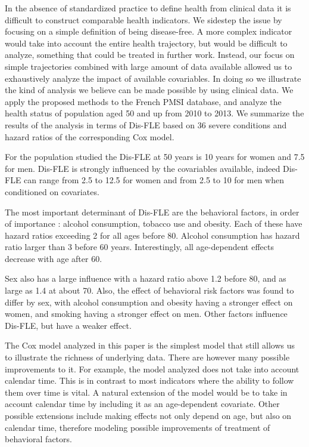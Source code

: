 \documentclass[risks,article,submit,moreauthors,pdftex]{Definitions/mdpi}
\begin{document}
In the absence of standardized practice to define health from clinical
data it is difficult to construct comparable health indicators. We
sidestep the issue by focusing on a simple definition of being
disease-free. A more complex indicator would take into account the
entire health trajectory, but would be difficult to analyze, something
that could be treated in further work. Instead, our focus on simple
trajectories combined with large amount of data available allowed us to
exhaustively analyze the impact of available covariables. In doing so we
illustrate the kind of analysis we believe can be made possible by using
clinical data. We apply the proposed methods to the French PMSI
database, and analyze the health status of population aged 50 and up
from 2010 to 2013. We summarize the results of the analysis in terms of
Dis-FLE based on 36 severe conditions and hazard ratios of the
corresponding Cox model.

For the population studied the Dis-FLE at 50 years is 10 years for women
and 7.5 for men. Dis-FLE is strongly influenced by the covariables
available, indeed Dis-FLE can range from 2.5 to 12.5 for women and from
2.5 to 10 for men when conditioned on covariates.

The most important determinant of Dis-FLE are the behavioral factors, in
order of importance : alcohol consumption, tobacco use and obesity. Each
of these have hazard ratios exceeding 2 for all ages before 80. Alcohol
consumption has hazard ratio larger than 3 before 60 years.
Interestingly, all age-dependent effects decrease with age after 60.

Sex also has a large influence with a hazard ratio above 1.2 before 80,
and as large as 1.4 at about 70. Also, the effect of behavioral risk
factors was found to differ by sex, with alcohol consumption and obesity
having a stronger effect on women, and smoking having a stronger effect
on men. Other factors influence Dis-FLE, but have a weaker effect.

The Cox model analyzed in this paper is the simplest model that still
allows us to illustrate the richness of underlying data. There are
however many possible improvements to it. For example, the model
analyzed does not take into account calendar time. This is in contrast
to most indicators where the ability to follow them over time is vital.
A natural extension of the model would be to take in account calendar
time by including it as an age-dependent covariate. Other possible
extensions include making effects not only depend on age, but also on
calendar time, therefore modeling possible improvements of treatment of
behavioral factors.
\end{document}
